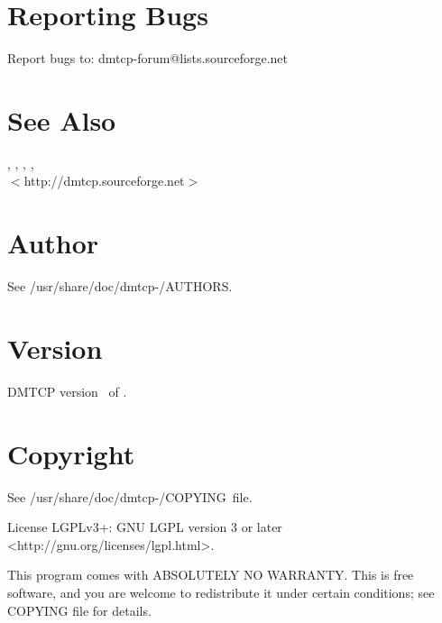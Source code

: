 \section{Reporting Bugs}
Report bugs to: dmtcp-forum@lists.sourceforge.net

\section{See Also}
, , ,
,  \\
 $<$http://dmtcp.sourceforge.net$>$

\section{Author}
See /usr/share/doc/dmtcp-\Version/AUTHORS.

\section{Version}

DMTCP version \Version\ of \Date.

\section{Copyright}
See /usr/share/doc/dmtcp-\Version/COPYING~file.

License LGPLv3+: GNU LGPL version 3 or later <http://gnu.org/licenses/lgpl.html>.

This program comes with ABSOLUTELY NO WARRANTY.
This is free software, and you are welcome to redistribute it under certain
conditions; see COPYING file for details.


